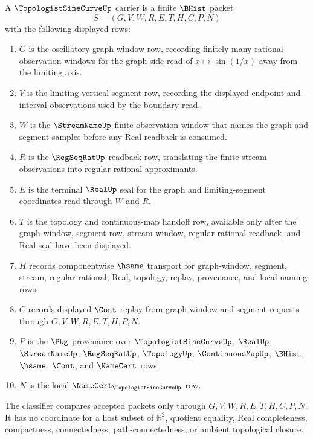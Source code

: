 \begin{definition}
\label{def:topologist-sine-curve-carrier}
A $\TopologistSineCurveUp$ carrier is a finite $\BHist$ packet
$$
S=(G,V,W,R,E,T,H,C,P,N)
$$
with the following displayed rows:
\begin{enumerate}
\item $G$ is the oscillatory graph-window row, recording finitely many rational observation windows for the graph-side read of $x \mapsto \sin(1/x)$ away from the limiting axis.
\item $V$ is the limiting vertical-segment row, recording the displayed endpoint and interval observations used by the boundary read.
\item $W$ is the $\StreamNameUp$ finite observation window that names the graph and segment samples before any Real readback is consumed.
\item $R$ is the $\RegSeqRatUp$ readback row, translating the finite stream observations into regular rational approximants.
\item $E$ is the terminal $\RealUp$ seal for the graph and limiting-segment coordinates read through $W$ and $R$.
\item $T$ is the topology and continuous-map handoff row, available only after the graph window, segment row, stream window, regular-rational readback, and Real seal have been displayed.
\item $H$ records componentwise $\hsame$ transport for graph-window, segment, stream, regular-rational, Real, topology, replay, provenance, and local naming rows.
\item $C$ records displayed $\Cont$ replay from graph-window and segment requests through $G,V,W,R,E,T,H,P,N$.
\item $P$ is the $\Pkg$ provenance over $\TopologistSineCurveUp$, $\RealUp$, $\StreamNameUp$, $\RegSeqRatUp$, $\TopologyUp$, $\ContinuousMapUp$, $\BHist$, $\hsame$, $\Cont$, and $\NameCert$ rows.
\item $N$ is the local $\NameCert_{\TopologistSineCurveUp}$ row.
\end{enumerate}
The classifier compares accepted packets only through $G,V,W,R,E,T,H,C,P,N$. It has no coordinate for a host subset of $\mathbb{R}^2$, quotient equality, Real completeness, compactness, connectedness, path-connectedness, or ambient topological closure.
\end{definition}

